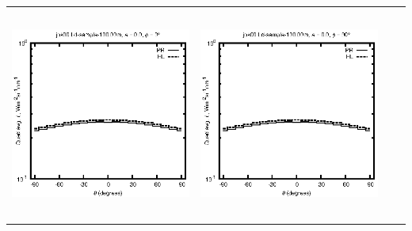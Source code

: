 \begin{tabular}{c c c c}
\includegraphics[height=7cm]{../eps/jok00_Ld_sample_100.00m_fwd.eps} &
\includegraphics[height=7cm]{../eps/jok00_Ld_sample_100.00m_cross.eps} \\
\end{tabular}

\pagebreak

